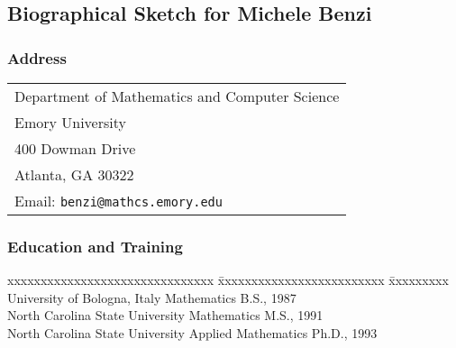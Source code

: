 
\subsection{Biographical Sketch for Michele Benzi}

\subsubsection*{Address}
\begin{tabular}{l}
  Department of Mathematics and Computer Science \\
  Emory University \\
  400 Dowman Drive \\
  Atlanta, GA 30322 \\
  Email: {\tt benzi@mathcs.emory.edu}
\end{tabular}


\vspace*{-1ex}
\subsubsection*{Education and Training}
\vspace*{-1ex}
\begin{tabbing}
  \hspace*{1ex}
  xxxxxxxxxxxxxxxxxxxxxxxxxxxxxxx \= xxxxxxxxxxxxxxxxxxxxxxxxx \= xxxxxxxxx \kill
  University of Bologna, Italy \> Mathematics \>  B.S., 1987 \\
  North Carolina State University \> Mathematics \> M.S., 1991 \\
  North Carolina State University \> Applied Mathematics \> Ph.D., 1993
\end{tabbing}


\vspace*{-3ex}
